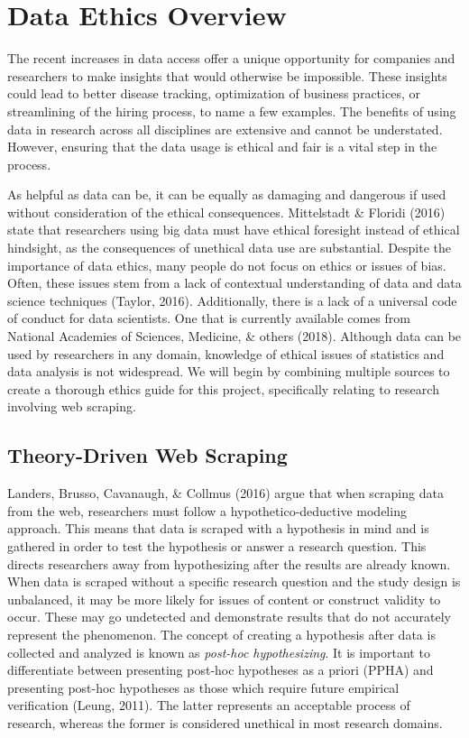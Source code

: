 \documentclass[12pt,twoside]{reedthesis}
\begin{document}
\section{Data Ethics Overview}\label{data-ethics-overview}

The recent increases in data access offer a unique opportunity for
companies and researchers to make insights that would otherwise be
impossible. These insights could lead to better disease tracking,
optimization of business practices, or streamlining of the hiring
process, to name a few examples. The benefits of using data in research
across all disciplines are extensive and cannot be understated. However,
ensuring that the data usage is ethical and fair is a vital step in the
process.

As helpful as data can be, it can be equally as damaging and dangerous
if used without consideration of the ethical consequences. Mittelstadt
\& Floridi (2016) state that researchers using big data must have
ethical foresight instead of ethical hindsight, as the consequences of
unethical data use are substantial. Despite the importance of data
ethics, many people do not focus on ethics or issues of bias. Often,
these issues stem from a lack of contextual understanding of data and
data science techniques (Taylor, 2016). Additionally, there is a lack of
a universal code of conduct for data scientists. One that is currently
available comes from National Academies of Sciences, Medicine, \& others
(2018). Although data can be used by researchers in any domain,
knowledge of ethical issues of statistics and data analysis is not
widespread. We will begin by combining multiple sources to create a
thorough ethics guide for this project, specifically relating to
research involving web scraping.

\subsection{Theory-Driven Web
Scraping}\label{theory-driven-web-scraping}

Landers, Brusso, Cavanaugh, \& Collmus (2016) argue that when scraping
data from the web, researchers must follow a hypothetico-deductive
modeling approach. This means that data is scraped with a hypothesis in
mind and is gathered in order to test the hypothesis or answer a
research question. This directs researchers away from hypothesizing
after the results are already known. When data is scraped without a
specific research question and the study design is unbalanced, it may be
more likely for issues of content or construct validity to occur. These
may go undetected and demonstrate results that do not accurately
represent the phenomenon. The concept of creating a hypothesis after
data is collected and analyzed is known as \emph{post-hoc
hypothesizing}. It is important to differentiate between presenting
post-hoc hypotheses as a priori (PPHA) and presenting post-hoc
hypotheses as those which require future empirical verification (Leung,
2011). The latter represents an acceptable process of research, whereas
the former is considered unethical in most research domains.
\end{document}
